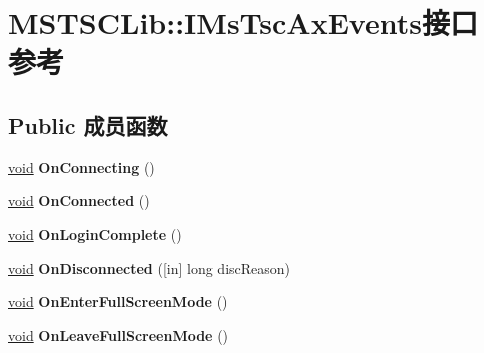 \hypertarget{interface_m_s_t_s_c_lib_1_1_i_ms_tsc_ax_events}{}\section{M\+S\+T\+S\+C\+Lib\+:\+:I\+Ms\+Tsc\+Ax\+Events接口 参考}
\label{interface_m_s_t_s_c_lib_1_1_i_ms_tsc_ax_events}
\subsection*{Public 成员函数}
\begin{DoxyCompactItemize}
\item 
\mbox{\label{interface_m_s_t_s_c_lib_1_1_i_ms_tsc_ax_events_a30d539ba9ae136e193ba648a94b87f36}} 
\hyperlink{interfacevoid}{void} {\bfseries On\+Connecting} ()
\item 
\mbox{\label{interface_m_s_t_s_c_lib_1_1_i_ms_tsc_ax_events_a10f446233cfb58969842e6c31a425f34}} 
\hyperlink{interfacevoid}{void} {\bfseries On\+Connected} ()
\item 
\mbox{\label{interface_m_s_t_s_c_lib_1_1_i_ms_tsc_ax_events_a9469a4d55b26b5e22baa44855b2e02e0}} 
\hyperlink{interfacevoid}{void} {\bfseries On\+Login\+Complete} ()
\item 
\mbox{\label{interface_m_s_t_s_c_lib_1_1_i_ms_tsc_ax_events_a436961cde84374e65cb8f4af112c60b8}} 
\hyperlink{interfacevoid}{void} {\bfseries On\+Disconnected} (\mbox{[}in\mbox{]} long disc\+Reason)
\item 
\mbox{\label{interface_m_s_t_s_c_lib_1_1_i_ms_tsc_ax_events_a86f365be1acea4c3f0fec1128cd45ffc}} 
\hyperlink{interfacevoid}{void} {\bfseries On\+Enter\+Full\+Screen\+Mode} ()
\item 
\mbox{\label{interface_m_s_t_s_c_lib_1_1_i_ms_tsc_ax_events_a0e18e657481281a83c9b72d80954c688}} 
\hyperlink{interfacevoid}{void} {\bfseries On\+Leave\+Full\+Screen\+Mode} ()
\item 

\end{DoxyCompactItemize}
